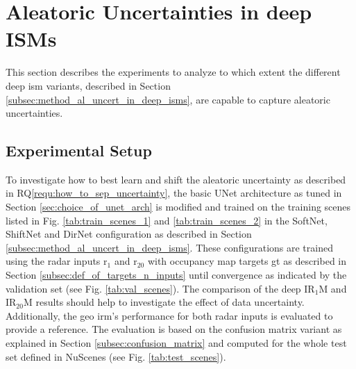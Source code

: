 \section{Aleatoric Uncertainties in deep ISMs}
\label{sec:al_uncert_in_deep_isms}
This section describes the experiments to analyze to which extent the different deep \gls{ism} variants, described in Section \ref{subsec:method_al_uncert_in_deep_isms}, are capable to capture aleatoric uncertainties.
%
\subsection{Experimental Setup}
\label{subsec:exp_setup_aleat_uncert}
To investigate how to best learn and shift the aleatoric uncertainty as described in RQ\ref{requ:how_to_sep_uncertainty}, the basic UNet architecture as tuned in Section \ref{sec:choice_of_unet_arch} is modified and trained on the training scenes listed in Fig. \ref{tab:train_scenes_1} and  \ref{tab:train_scenes_2} in the SoftNet, ShiftNet and DirNet configuration as described in Section \ref{subsec:method_al_uncert_in_deep_isms}. These configurations are trained using the radar inputs \gls{r}$_1$ and \gls{r}$_{20}$ with occupancy map targets \gls{gt} as described in Section \ref{subsec:def_of_targets_n_inputs} until convergence as indicated by the validation set (see Fig. \ref{tab:val_scenes}). The comparison of the deep IR$_1$M and IR$_{20}$M results should help to investigate the effect of data uncertainty. Additionally, the geo \gls{irm}'s performance for both radar inputs is evaluated to provide a reference. The evaluation is based on the confusion matrix variant as explained in Section \ref{subsec:confusion_matrix} and computed for the whole test set defined in NuScenes (see Fig. \ref{tab:test_scenes}).
%
